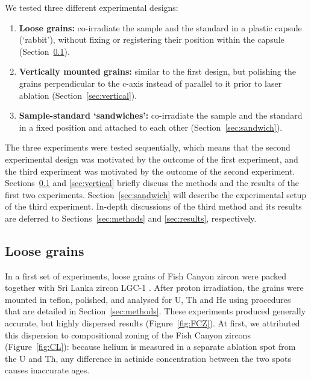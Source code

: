 \documentclass{article}
\begin{document}
We tested three different experimental designs:
\begin{enumerate}
\item{\bf Loose grains:} co-irradiate the sample and the standard in a
  plastic capsule (`rabbit'), without fixing or registering their
  position within the capsule (Section~\ref{sec:loose}).
\item{\bf Vertically mounted grains:} similar to the first design, but
  polishing the grains perpendicular to the c-axis instead of parallel
  to it prior to laser ablation (Section~\ref{sec:vertical}).
\item{\bf Sample-standard `sandwiches':} co-irradiate the sample and the
  standard in a fixed position and attached to each other
  (Section~\ref{sec:sandwich}).
\end{enumerate}

The three experiments were tested sequentially, which means that the
second experimental design was motivated by the outcome of the first
experiment, and the third experiment was motivated by the outcome of
the second experiment. Sections~\ref{sec:loose} and \ref{sec:vertical}
briefly discuss the methods and the results of the first two
experiments.  Section~\ref{sec:sandwich} will describe the
experimental setup of the third experiment. In-depth discussions of
the third method and its results are deferred to
Sections~\ref{sec:methods} and \ref{sec:results}, respectively.

\subsection{Loose grains}\label{sec:loose}

In a first set of experiments, loose grains of Fish Canyon zircon were
packed together with Sri Lanka zircon LGC-1
\citep[476.4$\pm$5.7~Ma,][]{tian2017}. After proton irradiation, the
grains were mounted in teflon, polished, and analysed for U, Th and He
using procedures that are detailed in Section~\ref{sec:methods}. These
experiments produced generally accurate, but highly dispersed results
(Figure~\ref{fig:FCZ}). At first, we attributed this dispersion to
compositional zoning of the Fish Canyon zircons (Figure~\ref{fig:CL}):
because helium is measured in a separate ablation spot from the U and
Th, any difference in actinide concentration between the two spots
causes inaccurate ages.\medskip
\end{document}
